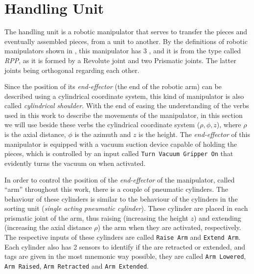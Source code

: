 \section{Handling Unit}
\label{sec:handlingUnit}
The handling unit is a robotic manipulator that serves to transfer the pieces
and eventually assembled pieces, from a unit to another. By the definitions of
robotic manipulators shown in \cite{khalil2004modeling}, this manipulator has 3
\DOF{}, and it is from the type called \emph{RPP}, as
it is formed by a Revolute joint and two Prismatic joints. The latter joints
being orthogonal regarding each other.

Since the position of its
\emph{end-effector} (the end of the robotic arm) can be described using a
cylindrical coordinate system, this kind of manipulator is also called
\emph{cylindrical shoulder}. With the end of easing the understanding of the
verbs used in this work to describe the movements of the manipulator, in this
section we will use beside these verbs the cylindrical coordinate
system ($\rho,\phi,z$), where $\rho$ is the axial distance, $\phi$ is the azimuth
and $z$ is the height.
The \emph{end-effector} of this manipulator is equipped with a vacuum suction
device capable of holding the pieces, which is controlled by an input called
\verb|Turn Vacuum Gripper On| that evidently turns the vacuum on when activated.

In order to control the position of the \emph{end-effector} of the manipulator, called
``arm'' throughout this work, there is a couple of pneumatic cylinders. The
behaviour of these cylinders is similar
to the behaviour of the cylinders in the sorting unit (\emph{single acting
  pneumatic cylinder}). These cylinder are placed in each
prismatic joint of the arm, thus raising (increasing the height $z$) and extending (increasing the
axial distance $\rho$) the arm when they are activated, respectively. The
respective inputs
of these cylinders are called \verb|Raise Arm| and \verb|Extend Arm|. Each
cylinder also has 2 sensors to identify if the are retracted or extended, and tags are given in the most mnemonic way possible, they are called
\verb|Arm Lowered|, \verb|Arm Raised|, \verb|Arm Retracted| and
\verb|Arm Extended|.

